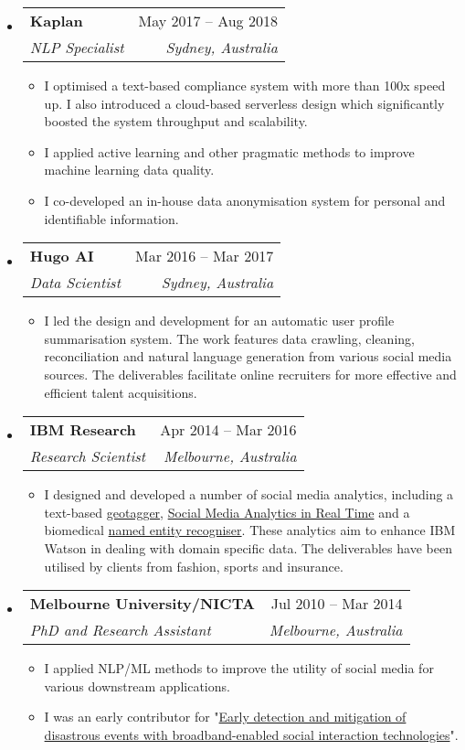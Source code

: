 \documentclass[letterpaper,12pt]{article}[leftmargin=*]
\makeatletter
\def \entryspacing {-0pt}
\newcommand{\resumeEntryStart}{\begin{itemize}[leftmargin=2.5mm]}
\newcommand{\resumeEntryEnd}{\end{itemize}\vspace{\entryspacing}}
\newcommand{\resumeItemListStart}{\begin{itemize}[leftmargin=4.5mm]}
\newcommand{\resumeItemListEnd}{\end{itemize}}
\newcommand{\resumeItem}[1]{
  \item\small{
    {#1 \vspace{-2pt}}
  }
}
\newcommand{\resumeEntryTSDL}[4]{
  \vspace{-1pt}\item[]
    \begin{tabularx}{0.97\textwidth}{X@{\hspace{60pt}}r}
      \textbf{\color{primary}#1} & {\firabook\color{accent}\small#2} \\
      \textit{\color{accent}\small#3} & \textit{\color{accent}\small#4} \\
    \end{tabularx}\vspace{-6pt}
}
\makeatother
\begin{document}
  \resumeEntryStart
    \resumeEntryTSDL
      {Kaplan}{May 2017 -- Aug 2018}
      {NLP Specialist}{Sydney, Australia}
    \resumeItemListStart
      \resumeItem {I optimised a text-based compliance system with more than 100x speed up. I also introduced a cloud-based serverless design which significantly boosted the system throughput and scalability.}
      \resumeItem {I applied active learning and other pragmatic methods to improve machine learning data quality.}
      \resumeItem {I co-developed an in-house data anonymisation system for personal and identifiable information.}
    \resumeItemListEnd
  \resumeEntryEnd

  \resumeEntryStart
    \resumeEntryTSDL
      {Hugo AI}{Mar 2016 -- Mar 2017}
      {Data Scientist}{Sydney, Australia}
    \resumeItemListStart
        \resumeItem {I led the design and development for an automatic user profile summarisation system. The work features data crawling, cleaning, reconciliation and natural language generation from various social media sources. The deliverables facilitate online recruiters for more effective and efficient talent acquisitions.}
    \resumeItemListEnd
  \resumeEntryEnd

  \resumeEntryStart
    \resumeEntryTSDL
      {IBM Research}{Apr 2014 -- Mar 2016}
      {Research Scientist}{Melbourne, Australia}
    \resumeItemListStart
      \resumeItem {I designed and developed a number of social media analytics, including a text-based \href{http://researcher.watson.ibm.com/researcher/view_group.php?id=6349}{geotagger}, \href{http://researcher.watson.ibm.com/researcher/view_group.php?id=6350}{Social Media Analytics in Real Time} and a biomedical \href{http://researcher.watson.ibm.com/researcher/view_group_pubs.php?grp=5727}{named entity recogniser}. These analytics aim to enhance IBM Watson in dealing with domain specific data. The deliverables have been utilised by clients from fashion, sports and insurance.}
    \resumeItemListEnd
  \resumeEntryEnd

  \resumeEntryStart
    \resumeEntryTSDL
      {Melbourne University/NICTA}{Jul 2010 -- Mar 2014}
      {PhD and Research Assistant}{Melbourne, Australia}
    \resumeItemListStart
      \resumeItem {I applied NLP/ML methods to improve the utility of social media for various downstream applications.}
      \resumeItem {I was an early contributor for "\href{http://research.unimelb.edu.au/__data/assets/pdf_file/0006/1891914/IBES-2012-Annual-Report.pdf}{Early detection and mitigation of disastrous events with broadband-enabled social interaction technologies}".}
    \resumeItemListEnd
  \resumeEntryEnd
\end{document}
